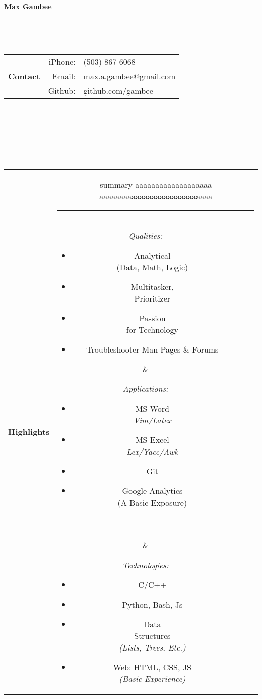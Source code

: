 \documentclass[12pt]{article}
\begin{document}
\Large\textbf{Max Gambee} \normalsize\\
\rule{5.5in}{1pt}\\\\
\begin{tabular}{r|rl}
\multirow{3}{*}{\textbf{Contact}} & iPhone: & (503) 867 6068\\
& Email: & max.a.gambee@gmail.com\\
& Github: & github.com/gambee\\
\end{tabular}
\\\\\rule{5.5in}{1pt}\\\\
\begin{tabular}{r|c|c|c}
\multirow{2}{*}{\textbf{Highlights}}
& \multicolumn{3}{|c}{\parbox{4.32in}{
	summary aaaaaaaaaaaaaaaaaaa aaaaaaaaaaaaaaaaaaaaaaaaaaaa\\\rule[0.5em]{4.25in}{0.3pt}
}}\\
& \parbox{1.4in}{\footnotesize \textit{Qualities:}
	\begin{itemize}
	\item Analytical\\
	\tiny(Data, Math, Logic)\footnotesize
	\item Multitasker,\\ Prioritizer
	\item Passion \\for Technology
	\item Troubleshooter Man-Pages \& Forums
	\end{itemize}}
& \parbox{1.5in}{\footnotesize \textit{Applications:}
	\begin{itemize}
		\item MS-Word\\\textit{Vim/Latex}
		\item MS Excel\\\textit{Lex/Yacc/Awk}
		\item Git
		\item Google Analytics\\
			\tiny (A Basic Exposure)\footnotesize\\\\\tiny\vfill~\\
			

	\end{itemize}}
& \parbox{1.3in}{\footnotesize \textit{Technologies:}
	\begin{itemize}
	\item C/C++
	\item Python, Bash, Js
	\item Data \\Structures\\\tiny\textit{(Lists, Trees, Etc.)}\footnotesize
	\item Web: HTML, CSS, JS\\\tiny\textit{(Basic Experience)}\footnotesize
	\end{itemize}}\\
\end{tabular}
\end{document}
